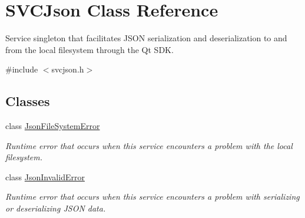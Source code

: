 \hypertarget{class_s_v_c_json}{}\section{S\+V\+C\+Json Class Reference}
\label{class_s_v_c_json}


Service singleton that facilitates J\+S\+ON serialization and deserialization to and from the local filesystem through the Qt S\+DK.  




{\ttfamily \#include $<$svcjson.\+h$>$}

\subsection*{Classes}
\begin{DoxyCompactItemize}
\item 
class \mbox{\hyperlink{class_s_v_c_json_1_1_json_file_system_error}{Json\+File\+System\+Error}}
\begin{DoxyCompactList}\small\item\em Runtime error that occurs when this service encounters a problem with the local filesystem. \end{DoxyCompactList}\item 
class \mbox{\hyperlink{class_s_v_c_json_1_1_json_invalid_error}{Json\+Invalid\+Error}}
\begin{DoxyCompactList}\small\item\em Runtime error that occurs when this service encounters a problem with serializing or deserializing J\+S\+ON data. \end{DoxyCompactList}\end{DoxyCompactItemize}
